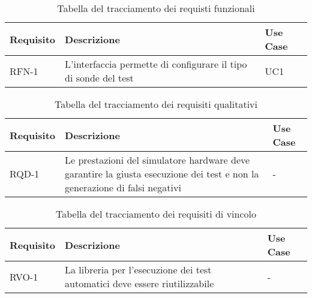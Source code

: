 \newpage

\begin{table}%
  \caption{Tabella del tracciamento dei requisti funzionali}
  \label{tab:requisiti-funzionali}
  \begin{tabularx}{\textwidth}{lXl}
    \hline\hline
    \textbf{Requisito} & \textbf{Descrizione}                                            & \textbf{Use Case} \\
    \hline
    RFN-1              & L'interfaccia permette di configurare il tipo di sonde del test & UC1               \\
    \hline
  \end{tabularx}
\end{table}%

\begin{table}%
  \caption{Tabella del tracciamento dei requisiti qualitativi}
  \label{tab:requisiti-qualitativi}
  \begin{tabularx}{\textwidth}{lXl}
    \hline\hline
    \textbf{Requisito} & \textbf{Descrizione}                                                                                                       & \textbf{Use Case} \\
    \hline
    RQD-1              & Le prestazioni del simulatore hardware deve garantire la giusta esecuzione dei test e non la generazione di falsi negativi & -                 \\
    \hline
  \end{tabularx}
\end{table}%

\begin{table}%
  \caption{Tabella del tracciamento dei requisiti di vincolo}
  \label{tab:requisiti-vincolo}
  \begin{tabularx}{\textwidth}{lXl}
    \hline\hline
    \textbf{Requisito} & \textbf{Descrizione}                                                        & \textbf{Use Case} \\
    \hline
    RVO-1              & La libreria per l'esecuzione dei test automatici deve essere riutilizzabile & -                 \\
    \hline
  \end{tabularx}
\end{table}%